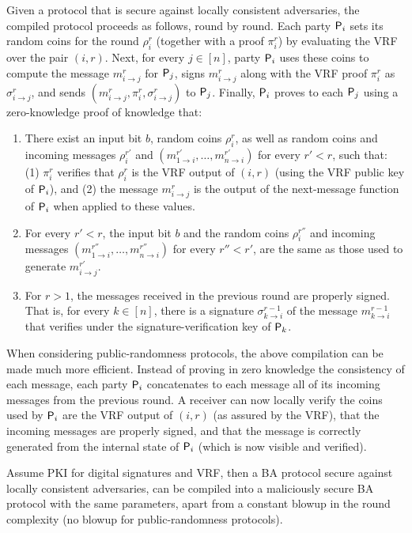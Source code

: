 Given a protocol that is secure against locally consistent adversaries, the compiled protocol proceeds as follows, round by round.
Each party $\mathsf{P}_i$ sets its random coins for the \rth round $\rho_i^r$ (together with a proof $\pi_i^r$) by evaluating the VRF over the pair $(i,r)$.
Next, for every $j\in[n]$, party $\mathsf{P}_i$ uses these coins to compute the message $m^r_{i\to j}$ for $\mathsf{P}_j$, signs $m^r_{i\to j}$ along with the VRF proof $\pi^r_i$ as $\sigma^r_{i\to j}$, and sends $(m^r_{i\to j},\pi_i^r,\sigma^r_{i\to j})$ to $\mathsf{P}_j$.
Finally, $\mathsf{P}_i$ proves to each $\mathsf{P}_j$ using a zero-knowledge proof of knowledge that:
\begin{enumerate}
    \item
    There exist an input bit $b$, random coins $\rho_i^r$, as well as random coins and incoming messages $\rho^{r'}_i$ and $(m^{r'}_{1\to i},\ldots,m^{r'}_{n\to i})$ for every $r'<r$, such that: (1) $\pi_i^r$ verifies that $\rho_i^r$ is the VRF output of $(i,r)$ (using the VRF public key of $\mathsf{P}_i$), and (2) the message $m^r_{i\to j}$ is the output of the next-message function of $\mathsf{P}_i$ when applied to these values.
    \item
    For every $r'<r$, the input bit $b$ and the random coins $\rho^{r''}_i$ and incoming messages $(m^{r''}_{1\to i},\ldots,m^{r''}_{n\to i})$ for every $r''<r'$, are the same as those used to generate $m^{r'}_{i\to j}$.
    \item
    For $r>1$, the messages received in the previous round are properly signed. That is, for every $k\in[n]$, there is a signature $\sigma^{r-1}_{k\to i}$ of the message $m^{r-1}_{k\to i}$ that verifies under the signature-verification key of $\mathsf{P}_k$.
\end{enumerate}

When considering public-randomness protocols, the above compilation can be made much more efficient. Instead of proving in zero knowledge the consistency of each message, each party $\mathsf{P}_i$ concatenates to each message all of its incoming messages from the previous round. A receiver can now locally verify the coins used by $\mathsf{P}_i$ are the VRF output of $(i,r)$ (as assured by the VRF), that the incoming messages are properly signed, and that the message is correctly generated from the internal state of $\mathsf{P}_i$ (which is now visible and verified).

\begin{theorem}\label{thm:local_to_malicious}
Assume PKI for digital signatures and VRF, then a BA protocol secure against locally consistent adversaries, can be compiled into a maliciously secure BA protocol with the same parameters, apart from a constant blowup in the round complexity (no blowup for public-randomness protocols).
\end{theorem}

